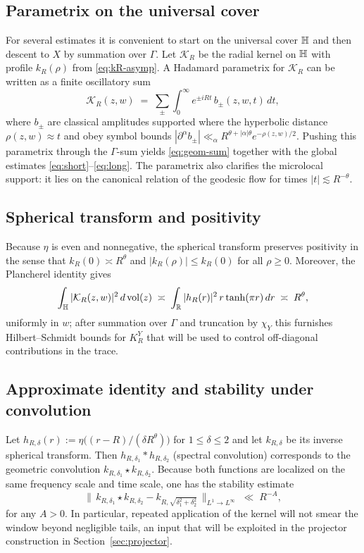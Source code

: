 \subsection{Parametrix on the universal cover}\label{subsec:parametrix}
For several estimates it is convenient to start on the universal cover $\mathbb{H}$ and then descent to $X$ by summation over $\Gamma$. Let $\mathcal{K}_R$ be the radial kernel on $\mathbb{H}$ with profile $k_R(\rho)$ from \eqref{eq:kR-asymp}. A Hadamard parametrix for $\mathcal{K}_R$ can be written as a finite oscillatory sum
\[
\mathcal{K}_R(z,w) \;=\; \sum_{\pm} \int_0^\infty e^{\pm i R t}\, b_\pm(z,w,t)\, dt,
\]
where $b_\pm$ are classical amplitudes supported where the hyperbolic distance $\rho(z,w)\approx t$ and obey symbol bounds $|\partial^\alpha b_\pm|\ll_\alpha R^{\theta+|\alpha|\theta} e^{-\rho(z,w)/2}$. Pushing this parametrix through the $\Gamma$-sum yields \eqref{eq:geom-sum} together with the global estimates \eqref{eq:short}–\eqref{eq:long}. The parametrix also clarifies the microlocal support: it lies on the canonical relation of the geodesic flow for times $|t|\lesssim R^{-\theta}$.

\subsection{Spherical transform and positivity}\label{subsec:positivity}
Because $\eta$ is even and nonnegative, the spherical transform preserves positivity in the sense that $k_R(0)\asymp R^\theta$ and $|k_R(\rho)|\le k_R(0)$ for all $\rho\ge 0$. Moreover, the Plancherel identity gives
\[
\int_{\mathbb{H}} |\mathcal{K}_R(z,w)|^2\, d\operatorname{vol}(z) \;\asymp\; \int_{\mathbb{R}} |h_R(r)|^2\, r\tanh(\pi r)\, dr \;\asymp\; R^\theta,
\]
uniformly in $w$; after summation over $\Gamma$ and truncation by $\chi_Y$ this furnishes Hilbert–Schmidt bounds for $K_R^Y$ that will be used to control off-diagonal contributions in the trace.

\subsection{Approximate identity and stability under convolution}\label{subsec:approx-id}
Let $h_{R,\delta}(r):=\eta\!\big((r-R)/(\delta R^\theta)\big)$ for $1\le \delta\le 2$ and let $k_{R,\delta}$ be its inverse spherical transform. Then $h_{R,\delta_1}*h_{R,\delta_2}$ (spectral convolution) corresponds to the geometric convolution $k_{R,\delta_1}\star k_{R,\delta_2}$. Because both functions are localized on the same frequency scale and time scale, one has the stability estimate
\[
\|\,k_{R,\delta_1}\star k_{R,\delta_2} - k_{R,\sqrt{\delta_1^2+\delta_2^2}}\,\|_{L^1\to L^\infty}
\;\ll\; R^{-\!A},
\]
for any $A>0$. In particular, repeated application of the kernel will not smear the window beyond negligible tails, an input that will be exploited in the projector construction in Section~\ref{sec:projector}.


